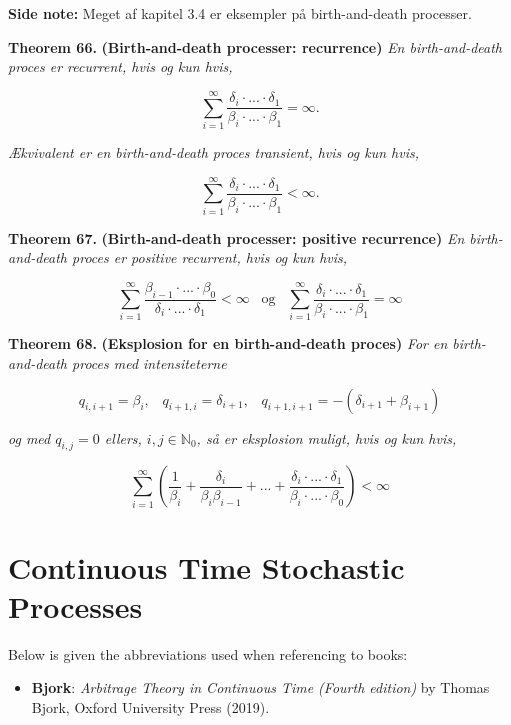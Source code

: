 \documentclass[a4paper,12pt,openany]{book}
\providecommand{\tightlist}{%
 \setlength{\itemsep}{0pt}\setlength{\parskip}{0pt}}
\begin{document}
\textbf{Side note:} Meget af kapitel 3.4 er eksempler på birth-and-death processer.

\textbf{Theorem 66.} \textbf{(Birth-and-death processer: recurrence)} \emph{En birth-and-death proces er recurrent, hvis og kun hvis,}

\[
\sum_{i=1}^\infty\frac{\delta_i\cdot...\cdot \delta_1}{\beta_i\cdot...\cdot \beta_1} = \infty.
\]

\emph{Ækvivalent er en birth-and-death proces transient, hvis og kun hvis,}

\[
\sum_{i=1}^\infty\frac{\delta_i\cdot...\cdot \delta_1}{\beta_i\cdot...\cdot \beta_1} < \infty.
\]

\textbf{Theorem 67.} \textbf{(Birth-and-death processer: positive recurrence)} \emph{En birth-and-death proces er positive recurrent, hvis og kun hvis,}

\[
\sum_{i=1}^\infty\frac{\beta_{i-1}\cdot...\cdot \beta_0}{\delta_i\cdot...\cdot \delta_1} < \infty \hspace{10pt} \text{og} \hspace{10pt} \sum_{i=1}^\infty\frac{\delta_i\cdot...\cdot \delta_1}{\beta_i\cdot...\cdot \beta_1} = \infty
\]

\textbf{Theorem 68.} \textbf{(Eksplosion for en birth-and-death proces)} \emph{For en birth-and-death proces med intensiteterne}

\[
q_{i,i+1} = \beta_i, \hspace{10pt} q_{i+1,i}=\delta_{i+1}, \hspace{10pt} q_{i+1,i+1} = -(\delta_{i+1}+\beta_{i+1})
\]

\emph{og med \(q_{i,j} = 0\) ellers, \(i,j \in \mathbb{N}_0\), så er eksplosion muligt, hvis og kun hvis,}

\[
\sum_{i=1}^\infty\left(\frac{1}{\beta_i}+\frac{\delta_i}{\beta_i\beta_{i-1}}+...+\frac{\delta_i\cdot...\cdot \delta_1}{\beta_i\cdot...\cdot \beta_0}\right)<\infty
\]

\hypertarget{continuous-time-stochastic-processes}{%
\chapter{Continuous Time Stochastic Processes}\label{continuous-time-stochastic-processes}}

Below is given the abbreviations used when referencing to books:

\begin{itemize}
\tightlist
\item
  \textbf{Bjork}: \emph{Arbitrage Theory in Continuous Time (Fourth edition)} by Thomas Bjork, Oxford University Press (2019).\cite{bjork2009}
\end{itemize}
\end{document}
